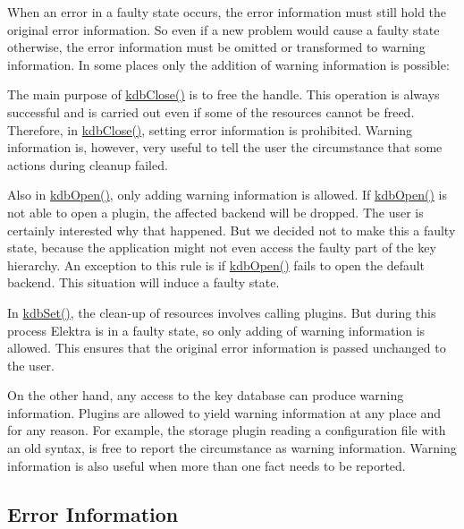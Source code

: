 When an error in a faulty state occurs, the error information must still hold the original error information. So even if a new problem would cause a faulty state otherwise, the error information must be omitted or transformed to warning information. In some places only the addition of warning information is possible\+:


\begin{DoxyItemize}
\item The main purpose of {\ttfamily \hyperlink{group__kdb_gadb54dc9fda17ee07deb9444df745c96f}{kdb\+Close()}} is to free the handle. This operation is always successful and is carried out even if some of the resources cannot be freed. Therefore, in {\ttfamily \hyperlink{group__kdb_gadb54dc9fda17ee07deb9444df745c96f}{kdb\+Close()}}, setting error information is prohibited. Warning information is, however, very useful to tell the user the circumstance that some actions during cleanup failed.
\item Also in {\ttfamily \hyperlink{group__kdb_ga6808defe5870f328dd17910aacbdc6ca}{kdb\+Open()}}, only adding warning information is allowed. If {\ttfamily \hyperlink{group__kdb_ga6808defe5870f328dd17910aacbdc6ca}{kdb\+Open()}} is not able to open a plugin, the affected backend will be dropped. The user is certainly interested why that happened. But we decided not to make this a faulty state, because the application might not even access the faulty part of the key hierarchy. An exception to this rule is if {\ttfamily \hyperlink{group__kdb_ga6808defe5870f328dd17910aacbdc6ca}{kdb\+Open()}} fails to open the default backend. This situation will induce a faulty state.
\item In {\ttfamily \hyperlink{group__kdb_ga11436b058408f83d303ca5e996832bcf}{kdb\+Set()}}, the clean-\/up of resources involves calling plugins. But during this process Elektra is in a faulty state, so only adding of warning information is allowed. This ensures that the original error information is passed unchanged to the user.
\end{DoxyItemize}

On the other hand, any access to the key database can produce warning information. Plugins are allowed to yield warning information at any place and for any reason. For example, the storage plugin reading a configuration file with an old syntax, is free to report the circumstance as warning information. Warning information is also useful when more than one fact needs to be reported.

\subsection*{Error Information}

